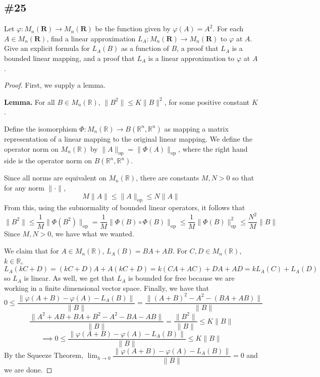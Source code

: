 \documentclass{article}
\newcommand{\R}{\mathbf{R}}
\newcommand{\op}{\mathrm{op}}
\theoremstyle{plain} %
\numberwithin{thm}{section} %
\theoremstyle{definition}
\begin{document}
        \subsection{\#25}

        Let $\varphi:M_n(\R)\rightarrow M_n(\R)$ be the function given by $\varphi(A)=A^2$. For each $A\in M_n(\R)$, find a linear approximation $L_A:M_n(\R)\rightarrow M_n(\R)$ to $\varphi$ at $A$. Give an explicit formula for $L_A(B)$ as a function of $B$, a proof that $L_A$ is a bounded linear mapping, and a proof that $L_A$ is a linear approximation to $\varphi$ at $A$.
        \begin{proof}
            First, we supply a lemma.

            \textbf{Lemma.} For all \(B \in M_n(\mathbb{R})\), \(\|B^2\| \leq K\|B\|^2\), for some positive constant \(K\).

            Define the isomorphism \(\Phi : M_n(\mathbb{R}) \to B(\mathbb{R}^n, \mathbb{R}^n)\) as mapping a matrix representation of a linear mapping to the original linear mapping. We define the operator norm on \(M_n(\mathbb{R})\) by \(\|A\| _{\op} = \|\Phi (A)\| _{\op}\), where the right hand side is the operator norm on \(B(\mathbb{R}^n, \mathbb{R}^n)\).

            Since all norms are equivalent on \(M_n(\mathbb{R})\), there are constants \(M,N >0\) so that for any norm \(\|\cdot\|\),
            \[
                M\|A\| \leq \|A\| _{\op} \leq N\|A\|
            \]
            From this, using the subnormality of bounded linear operators, it follows that
            \[
                \|B^2\| \leq \frac{1}{M}\|\Phi (B^2)\| _{\op}= \frac{1}{M}\|\Phi (B) \circ \Phi (B)\| _{\op} \leq \frac{1}{M}\|\Phi (B)\| _{\op}^2 \leq \frac{N^2}{M}\|B\|
            \]
            Since \(M,N > 0\), we have what we wanted.
            
            We claim that for \(A \in M_n(\mathbb{R})\), \(L_A(B) = BA + AB\). For \(C,D \in M_n(\mathbb{R})\), \(k \in \mathbb{R}\),
            \[
                L_A(kC + D) = (kC+D)A + A(kC+D) = k(CA + AC) + DA + AD = kL_A(C) + L_A(D)
            \]
            so \(L_A\) is linear. As well, we get that \(L_A\) is bounded for free because we are working in a finite dimensional vector space. Finally, we have that
            \[
                0 \leq \frac{\|\varphi (A + B) - \varphi (A) - L_A(B)\|}{\|B\|} = \frac{\|(A+B)^2 - A^2 - (BA + AB)\|}{\|B\|}
            \]
            \[
                \frac{\|A^2 + AB + BA + B^2 - A^2 - BA - AB\|}{\|B\|} = \frac{\|B^2\|}{\|B\|} \leq K\|B\|
            \]
            \[
                \implies 0 \leq \frac{\|\varphi (A + B) - \varphi (A) - L_A(B)\|}{\|B\|} \leq K\|B\|
            \]
            By the Squeeze Theorem, \(\lim_{h \to 0} \dfrac{\|\varphi (A + B) - \varphi (A) - L_A(B)\|}{\|B\|} = 0\) and we are done.
        \end{proof}
\end{document}

